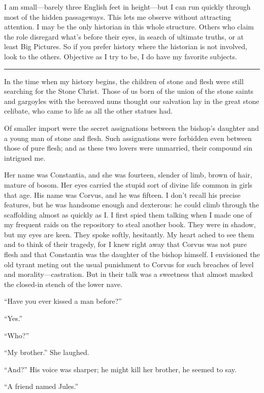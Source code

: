 I am small—barely three English feet in height—but I can run quickly through most of the hidden passageways. This lets me observe without attracting attention. I may be the only historian in this whole structure. Others who claim the role disregard what's before their eyes, in search of ultimate truths, or at least Big Pictures. So if you prefer history where the historian is not involved, look to the others. Objective as I try to be, I do have my favorite subjects.

\fancybreak{* * *}

In the time when my history begins, the children of stone and flesh were still searching for the Stone Christ. Those of us born of the union of the stone saints and gargoyles with the bereaved nuns thought our salvation lay in the great stone celibate, who came to life as all the other statues had.

Of smaller import were the secret assignations between the bishop's daughter and a young man of stone and flesh. Such assignations were forbidden even between those of pure flesh; and as these two lovers were unmarried, their compound sin intrigued me.

Her name was Constantia, and she was fourteen, slender of limb, brown of hair, mature of bosom. Her eyes carried the stupid sort of divine life common in girls that age. His name was Corvus, and he was fifteen. I don't recall his precise features, but he was handsome enough and dexterous: he could climb through the scaffolding almost as quickly as I. I first spied them talking when I made one of my frequent raids on the repository to steal another book. They were in shadow, but my eyes are keen. They spoke softly, hesitantly. My heart ached to see them and to think of their tragedy, for I knew right away that Corvus was not pure flesh and that Constantia was the daughter of the bishop himself. I envisioned the old tyrant meting out the usual punishment to Corvus for such breaches of level and morality—castration. But in their talk was a sweetness that almost masked the closed-in stench of the lower nave.

``Have you ever kissed a man before?''

``Yes.''

``Who?''

``My brother.'' She laughed.

``And?'' His voice was sharper; he might kill her brother, he seemed to say.

``A friend named Jules.''

